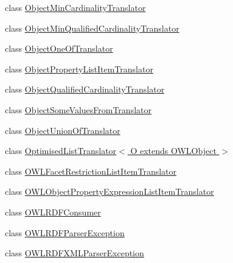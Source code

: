\begin{DoxyCompactItemize}
\item 
class \hyperlink{classorg_1_1coode_1_1owlapi_1_1rdfxml_1_1parser_1_1_object_min_cardinality_translator}{Object\-Min\-Cardinality\-Translator}
\item 
class \hyperlink{classorg_1_1coode_1_1owlapi_1_1rdfxml_1_1parser_1_1_object_min_qualified_cardinality_translator}{Object\-Min\-Qualified\-Cardinality\-Translator}
\item 
class \hyperlink{classorg_1_1coode_1_1owlapi_1_1rdfxml_1_1parser_1_1_object_one_of_translator}{Object\-One\-Of\-Translator}
\item 
class \hyperlink{classorg_1_1coode_1_1owlapi_1_1rdfxml_1_1parser_1_1_object_property_list_item_translator}{Object\-Property\-List\-Item\-Translator}
\item 
class \hyperlink{classorg_1_1coode_1_1owlapi_1_1rdfxml_1_1parser_1_1_object_qualified_cardinality_translator}{Object\-Qualified\-Cardinality\-Translator}
\item 
class \hyperlink{classorg_1_1coode_1_1owlapi_1_1rdfxml_1_1parser_1_1_object_some_values_from_translator}{Object\-Some\-Values\-From\-Translator}
\item 
class \hyperlink{classorg_1_1coode_1_1owlapi_1_1rdfxml_1_1parser_1_1_object_union_of_translator}{Object\-Union\-Of\-Translator}
\item 
class \hyperlink{classorg_1_1coode_1_1owlapi_1_1rdfxml_1_1parser_1_1_optimised_list_translator_3_01_o_01extends_01_o_w_l_object_01_4}{Optimised\-List\-Translator$<$ O extends O\-W\-L\-Object $>$}
\item 
class \hyperlink{classorg_1_1coode_1_1owlapi_1_1rdfxml_1_1parser_1_1_o_w_l_facet_restriction_list_item_translator}{O\-W\-L\-Facet\-Restriction\-List\-Item\-Translator}
\item 
class \hyperlink{classorg_1_1coode_1_1owlapi_1_1rdfxml_1_1parser_1_1_o_w_l_object_property_expression_list_item_translator}{O\-W\-L\-Object\-Property\-Expression\-List\-Item\-Translator}
\item 
class \hyperlink{classorg_1_1coode_1_1owlapi_1_1rdfxml_1_1parser_1_1_o_w_l_r_d_f_consumer}{O\-W\-L\-R\-D\-F\-Consumer}
\item 
class \hyperlink{classorg_1_1coode_1_1owlapi_1_1rdfxml_1_1parser_1_1_o_w_l_r_d_f_parser_exception}{O\-W\-L\-R\-D\-F\-Parser\-Exception}
\item 
class \hyperlink{classorg_1_1coode_1_1owlapi_1_1rdfxml_1_1parser_1_1_o_w_l_r_d_f_x_m_l_parser_exception}{O\-W\-L\-R\-D\-F\-X\-M\-L\-Parser\-Exception}
\item 

\end{DoxyCompactItemize}
